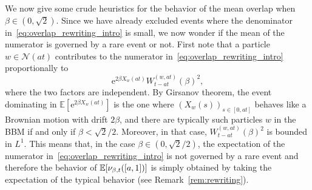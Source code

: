 \documentclass[10pt]{amsart}
\theoremstyle{definition}\newtheorem{defi}[theo]{Definition}\newtheorem{rema}[theo]{Remark}\newtheorem{exam}[theo]{Example}\newtheorem{exem}[theo]{Example}\newtheorem{nota}[theo]{Notation}
\newcommand{\e}{\mathrm{e}}
\newcommand{\E}{\mathbb{E}}
\newcommand\1{\mathds{1}}
\newcommand{\cN}{\mathcal{N}}
\newcommand{\Expec}[1]{\mathbb{E}\left[#1\right]}
\let\originalleft\left
\let\originalright\right
\renewcommand{\left}{\mathopen{}\mathclose\bgroup\originalleft}
\renewcommand{\right}{\aftergroup\egroup\originalright}
\begin{document}
We now give some crude heuristics for the behavior of the mean overlap when $\beta \in (0,\sqrt{2})$. Since we have already excluded events where the denominator in~\eqref{eq:overlap_rewriting_intro} is small, we now wonder if the mean of the numerator is governed by a rare event or not. First note that a particle $w \in \cN(at)$ contributes to the numerator in~\eqref{eq:overlap_rewriting_intro} proportionally to
\begin{equation}\label{eq:contrib_w}
\e^{2\beta X_w(at)} W_{t-at}^{(w,at)}(\beta)^2,
\end{equation}
where the two factors are independent. By Girsanov theorem, the event dominating in $\E[\e^{2\beta X_w(at)}]$ is the one where $(X_w(s))_{s\in[0,at]}$ behaves like a Brownian motion with drift $2\beta$, and there are typically such particles $w$ in the BBM if and only if $\beta < \sqrt{2}/2$. Moreover, in that case, $W_{t-at}^{(w,at)}(\beta)^2$ is bounded in $L^1$. This means that, in the case $\beta \in (0,\sqrt{2}/2)$, the expectation of the numerator in~\eqref{eq:overlap_rewriting_intro} is not governed by a rare event and therefore the behavior of $\Expec{\nu_{\beta, t}([a, 1])}$ is simply obtained by taking the expectation of the typical behavior (see Remark~\ref{rem:rewriting}).
\end{document}
